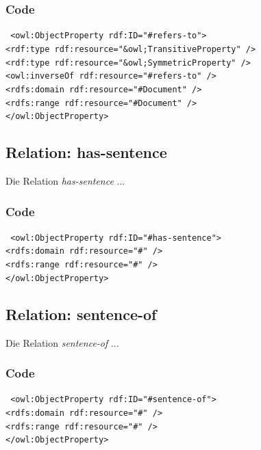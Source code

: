 ﻿\documentclass[
    11pt,
    latin1,
    a4paper,
    oneside
]{scrreprt}
\begin{document}
\subsubsection{Code} \label{sec:rel_refersto_code}

\texttt{ <owl:ObjectProperty rdf:ID="#refers-to"> \\
	<rdf:type rdf:resource="&owl;TransitiveProperty" /> \\
	<rdf:type rdf:resource="&owl;SymmetricProperty" /> \\
	<owl:inverseOf rdf:resource="#refers-to" /> \\
	<rdfs:domain rdf:resource="#Document" /> \\
	<rdfs:range rdf:resource="#Document" /> \\
</owl:ObjectProperty> }


\subsection{Relation: has-sentence} \label{sec:rel_hassentence}

Die Relation \emph{has-sentence} ...

\subsubsection{Code} \label{sec:rel_hassentence_code}

\texttt{ <owl:ObjectProperty rdf:ID="#has-sentence"> \\
	<rdfs:domain rdf:resource="#" /> \\
	<rdfs:range rdf:resource="#" /> \\
</owl:ObjectProperty> }


\subsection{Relation: sentence-of} \label{sec:rel_sentenceof}

Die Relation \emph{sentence-of} ...

\subsubsection{Code} \label{sec:rel_sentenceof_code}

\texttt{ <owl:ObjectProperty rdf:ID="#sentence-of"> \\
	<rdfs:domain rdf:resource="#" /> \\
	<rdfs:range rdf:resource="#" /> \\
</owl:ObjectProperty> }
\end{document}
